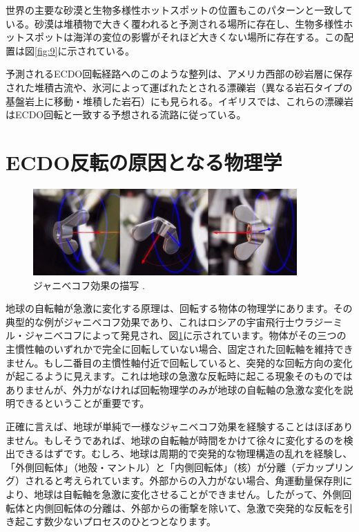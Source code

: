 \documentclass[10pt,twocolumn,letterpaper]{article}
\begin{document}
世界の主要な砂漠と生物多様性ホットスポットの位置もこのパターンと一致している。砂漠は堆積物で大きく覆われると予測される場所に存在し、生物多様性ホットスポットは海洋の変位の影響がそれほど大きくない場所に存在する\cite{28}。この配置は図\ref{fig:9}に示されている。

予測されるECDO回転経路へのこのような整列は、アメリカ西部の砂岩層に保存された堆積古流や、氷河によって運ばれたとされる漂礫岩（異なる岩石タイプの基盤岩上に移動・堆積した岩石）にも見られる\cite{21}。イギリスでは、これらの漂礫岩はECDO回転と一致する予想される流路に従っている\cite{67,68}。

\section{ECDO反転の原因となる物理学}
\begin{figure}
\begin{center}
\includegraphics[width=0.9\textwidth]{dzhani.jpg}
\end{center}
   \caption{ジャニベコフ効果の描写 \cite{28}.}
\label{fig:10}
\end{figure}

地球の自転軸が急激に変化する原理は、回転する物体の物理学にあります。その典型的な例がジャニベコフ効果であり、これはロシアの宇宙飛行士ウラジーミル・ジャニベコフによって発見され、図\ref{fig:10}に示されています。物体がその三つの主慣性軸のいずれかで完全に回転していない場合、固定された回転軸を維持できません。もし二番目の主慣性軸付近で回転していると、突発的な回転方向の変化が起こるように見えます。これは地球の急激な反転時に起こる現象そのものではありませんが、外力がなければ回転物理学のみが地球の自転軸の急激な変化を説明できるということが重要です。

正確に言えば、地球が単純で一様なジャニベコフ効果を経験することはほぼありません。もしそうであれば、地球の自転軸が時間をかけて徐々に変化するのを検出できるはずです。むしろ、地球は周期的で突発的な物理構造の乱れを経験し、「外側回転体」（地殻・マントル）と「内側回転体」（核）が分離（デカップリング）されると考えられています。外部からの入力がない場合、角運動量保存則により、地球は自転軸を急激に変化させることができません。したがって、外側回転体と内側回転体の分離は、外部からの衝撃を除いて、急激で突発的な反転を引き起こす数少ないプロセスのひとつとなります。
\end{document}
